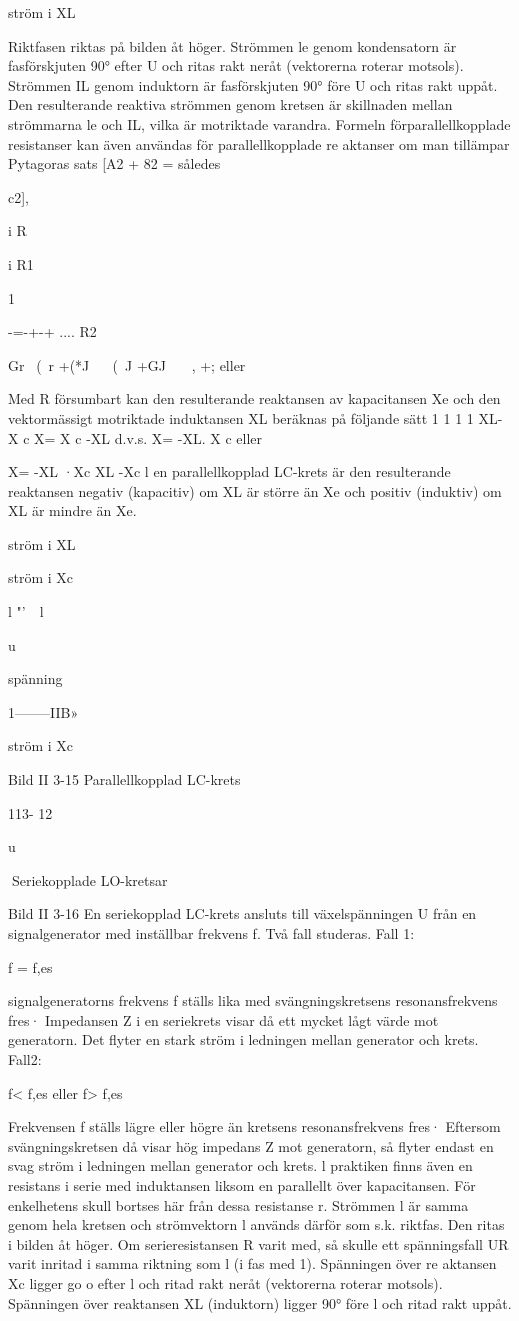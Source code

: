 {ström i XL

Riktfasen riktas på bilden åt höger. Strömmen le genom kondensatorn är fasförskjuten 90° efter U och ritas rakt neråt (vektorerna roterar motsols). Strömmen IL genom
induktorn är fasförskjuten 90° före U och
ritas rakt uppåt. Den resulterande reaktiva
strömmen genom kretsen är skillnaden mellan strömmarna le och IL, vilka är motriktade
varandra.
Formeln förparallellkopplade resistanser
kan även användas för parallellkopplade
re aktanser om man tillämpar Pytagoras sats
[A2 + 82 =
således

c2],

i
R

i
R1

1

-=-+-+ ....
R2

Gr ~(~r +(*J
~~ (~J +GJ ~~~, +;
eller

Med R försumbart kan den resulterande
reaktansen av kapacitansen Xe och den
vektormässigt motriktade induktansen XL beräknas på följande sätt
1
1
1
1 XL- X c
X= X c -XL d.v.s. X= -XL. X c eller

X= -XL ·Xc
XL -Xc
l en parallellkopplad LC-krets är den resulterande reaktansen negativ (kapacitiv) om XL
är större än Xe och positiv (induktiv) om XL är
mindre än Xe.

ström i XL

ström i Xc

l "'~~l

u

spänning

1--------IIB»

ström i Xc

Bild II 3-15 Parallellkopplad LC-krets

113- 12

u

Seriekopplade LO-kretsar

Bild II 3-16
En seriekopplad LC-krets ansluts till växelspänningen U från en signalgenerator med
inställbar frekvens f. Två fall studeras.
Fall 1:

f = f,es

signalgeneratorns frekvens f ställs lika
med svängningskretsens resonansfrekvens
fres· Impedansen Z i en seriekrets visar då ett
mycket lågt värde mot generatorn. Det flyter
en stark ström i ledningen mellan generator
och krets.
Fall2:

f< f,es eller f> f,es

Frekvensen f ställs lägre eller högre än
kretsens resonansfrekvens fres·
Eftersom svängningskretsen då visar hög
impedans Z mot generatorn, så flyter endast
en svag ström i ledningen mellan generator
och krets.
l praktiken finns även en resistans i serie
med induktansen liksom en parallellt över
kapacitansen. För enkelhetens skull bortses
här från dessa resistanse r.
Strömmen l är samma genom hela kretsen och strömvektorn l används därför som
s.k. riktfas. Den ritas i bilden åt höger. Om
serieresistansen R varit med, så skulle ett
spänningsfall UR varit inritad i samma riktning som l (i fas med 1). Spänningen över
re aktansen Xc ligger go o efter l och ritad rakt
neråt (vektorerna roterar motsols). Spänningen över reaktansen XL (induktorn) ligger
90° före l och ritad rakt uppåt.

}
